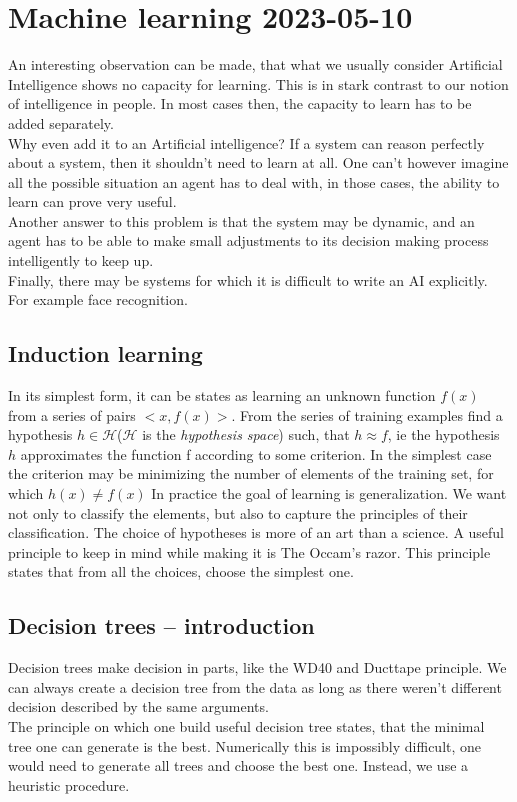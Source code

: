 
\chapter{Machine learning 2023-05-10}
An interesting observation can be made, that what we usually consider Artificial Intelligence shows no capacity for learning.
This is in stark contrast to our notion of intelligence in people. In most cases then, the capacity to learn has to be added
separately.
\\
Why even add it to an Artificial intelligence? If a system can reason perfectly about a system, then
it shouldn't need to learn at all. One can't however imagine all the possible situation an agent has to 
deal with, in those cases, the ability to learn can prove very useful.\\
Another answer to this problem is that the system may be dynamic, and an agent has to be able to make small
adjustments to its decision making process intelligently to keep up.\\
Finally, there may be systems for which it is difficult to write an AI explicitly. For example face recognition.

\section{Induction learning}
In its simplest form, it can be states as learning an unknown function $f(x)$ from a series of pairs  $<x,f(x)>$.
{
    From the series of training examples find a hypothesis $h \in \mathcal{H}$($\mathcal{H}$ is the \textit{hypothesis space}) such,
    that $h\approx f$, ie the hypothesis $h$ approximates the function f according to some criterion. 
    In the simplest case the criterion may be minimizing the number of elements of the training set, for which $h(x) \neq f(x)$
} 
In practice the goal of learning is generalization. We want not only to classify the elements, but also to capture the principles of their
classification.
\nt
{
    The choice of hypotheses is more of an art than a science. A useful principle to keep in mind while making it is The Occam's razor.
    This principle states that from all the choices, choose the simplest one.
}

\section{Decision trees -- introduction}
Decision trees make decision in parts, like the WD40 and Ducttape principle.
We can always create a decision tree from the data as long as there weren't different
decision described by the same arguments.\\
The principle on which one build useful decision tree states, that the minimal tree one
can generate is the best. Numerically this is impossibly difficult, one would need to generate
all trees and choose the best one. Instead, we use a heuristic procedure.

